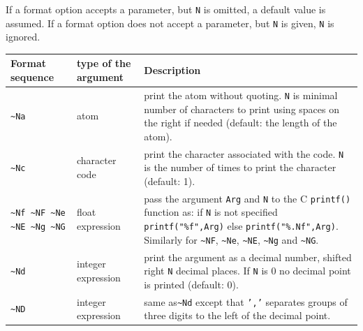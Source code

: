 If a format option accepts a parameter, but \texttt{N} is omitted, a default
value is assumed. If a format option does not accept a parameter, but \texttt{N}
is given, \texttt{N} is ignored.


\begin{tabular}{|C{1.4cm}|C{2.8cm}|p{10.45cm}|}
\hline

Format sequence  & type of the argument & Description \\

\hline\hline

\texttt{\~{}Na} & atom & print the atom without quoting. \texttt{N} is minimal
                         number of characters to print using spaces on the right
                         if needed (default: the length of the atom). \\

\hline

\texttt{\~{}Nc} & character code & print the character associated with the
                                   code. \texttt{N} is the number of times to
                                   print the character (default: 1). \\

\hline

\texttt{\~{}Nf \~{}NF \~{}Ne \~{}NE \~{}Ng \~{}NG}
               &  float expression & pass the argument \texttt{Arg} and
                                     \texttt{N} to the C \texttt{printf()}
                                     function as:
\newline
                               if \texttt{N} is not specified
                               \texttt{printf("\%f",Arg)} else
                               \texttt{printf("\%.Nf",Arg)}.
\newline
                                     Similarly for  \texttt{\~{}NF}, \texttt{\~{}Ne}, \texttt{\~{}NE},
                                     \texttt{\~{}Ng} and \texttt{\~{}NG}. \\

\hline

\texttt{\~{}Nd} & integer expression & print the argument as a decimal number,
                                         shifted right \texttt{N} decimal places.
                                         If \texttt{N} is 0 no decimal point is printed (default: 0). \\

\hline

\texttt{\~{}ND} & integer expression & same as\texttt{\~{}Nd} except
                                       that \texttt{','} separates groups of
                                       three digits to the left of the
                                       decimal point. \\


\end{tabular}
